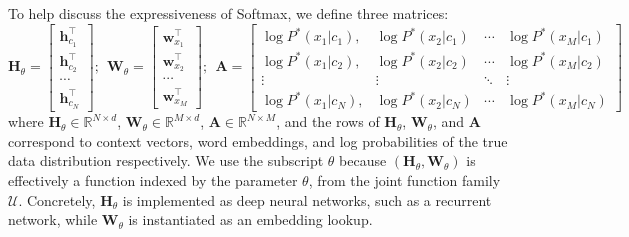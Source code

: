 To help discuss the expressiveness of Softmax, we define three matrices:
\[
\mathbf{H}_\theta = \begin{bmatrix}
\mathbf{h}_{c_1}^\top \\
\mathbf{h}_{c_2}^\top \\
\cdots \\
\mathbf{h}_{c_N}^\top
\end{bmatrix}; ~~
\mathbf{W}_\theta = \begin{bmatrix}
\mathbf{w}_{x_1}^\top \\
\mathbf{w}_{x_2}^\top \\
\cdots \\
\mathbf{w}_{x_M}^\top
\end{bmatrix}; ~~
\mathbf{A} = \begin{bmatrix}
\log P^* (x_1 | c_1),& \log P^* (x_2 | c_1)& \cdots& \log P^*(x_M | c_1) \\
\log P^* (x_1 | c_2),& \log P^* (x_2 | c_2)& \cdots& \log P^* (x_M | c_2) \\
\vdots& \vdots& \ddots& \vdots \\
\log P^* (x_1 | c_N),& \log P^* (x_2 | c_N)& \cdots& \log P^* (x_M | c_N)
\end{bmatrix}
\]
where $\mathbf{H}_\theta \in \mathbb{R}^{N \times d}$, $\mathbf{W}_\theta \in \mathbb{R}^{M \times d}$, $\mathbf{A} \in \mathbb{R}^{N \times M}$, and the rows of $\mathbf{H}_\theta$, $\mathbf{W}_\theta$, and $\mathbf{A}$ correspond to context vectors, word embeddings, and log probabilities of the true data distribution respectively. 
We use the subscript $\theta$ because $(\mathbf{H}_\theta, \mathbf{W}_\theta)$ is effectively a function indexed by the parameter $\theta$, from the joint function family $\mathcal{U}$.
Concretely, $\mathbf{H}_\theta$ is implemented as deep neural networks, such as a recurrent network, while $\mathbf{W}_\theta$ is instantiated as an embedding lookup.

